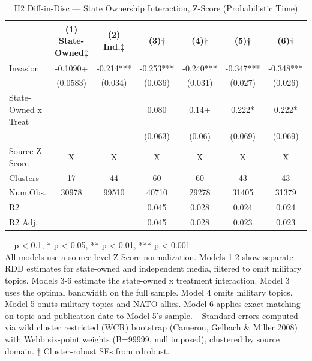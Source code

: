 \begin{table}[t]
\caption{\label{tab:table-02}H2 Diff-in-Disc — State Ownership Interaction, Z-Score (Probabilistic Time)}
\fontsize{12.0pt}{14.0pt}\selectfont
\begin{tabular*}{\linewidth}{@{\extracolsep{\fill}}lcccccc}
\toprule
  & (1) State-Owned‡ & (2) Ind.‡ & (3)† & (4)† & (5)† & (6)† \\ 
\midrule\addlinespace[2.5pt]
Invasion & -0.1090+ & -0.214*** & -0.253*** & -0.240*** & -0.347*** & -0.348*** \\ 
 & (0.0583) & (0.034) & (0.036) & (0.031) & (0.027) & (0.026) \\ 
State-Owned x Treat &  &  & 0.080 & 0.14+ & 0.222* & 0.222* \\ 
{} & {} & {} & {(0.063)} & {(0.06)} & {(0.069)} & {(0.069)} \\ 
Source Z-Score & X & X & X & X & X & X \\ 
Clusters & 17 & 44 & 60 & 60 & 43 & 43 \\ 
Num.Obs. & 30978 & 99510 & 40710 & 29278 & 31405 & 31379 \\ 
R2 &  &  & 0.045 & 0.028 & 0.024 & 0.024 \\ 
R2 Adj. &  &  & 0.045 & 0.028 & 0.023 & 0.023 \\ 
\bottomrule
\end{tabular*}
\begin{minipage}{\linewidth}
\vspace{.05em}
+ p < 0.1, * p < 0.05, ** p < 0.01, *** p < 0.001\\
All models use a source-level Z-Score normalization. Models 1-2 show separate
RDD estimates for state-owned and independent media, filtered to omit military
topics. Models 3-6 estimate the state-owned x treatment interaction. Model 3
uses the optimal bandwidth on the full sample. Model 4 omits military topics.
Model 5 omits military topics and NATO allies. Model 6 applies exact matching on
topic and publication date to Model 5's sample. † Standard errors computed via
wild cluster restricted (WCR) bootstrap (Cameron, Gelbach \& Miller 2008) with
Webb six-point weights (B=99999, null imposed), clustered by source domain. ‡
Cluster-robust SEs from rdrobust.\\
\end{minipage}
\end{table}

